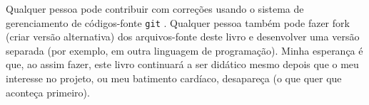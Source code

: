 Qualquer pessoa pode contribuir com correções usando o sistema de gerenciamento
de códigos-fonte \texttt{git}%
%
. Qualquer pessoa também pode fazer fork (criar versão alternativa) dos arquivos-fonte deste livro e desenvolver uma versão separada (por exemplo, em outra linguagem de programação).
Minha esperança é que, ao assim fazer, este livro continuará a
ser didático mesmo depois que o meu interesse no projeto, ou meu batimento cardíaco, desapareça (o que quer que aconteça primeiro).

